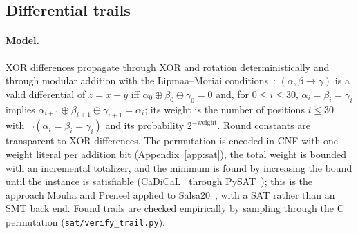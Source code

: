 \documentclass{iacrtrans}
\begin{document}
\subsection{Differential trails}
\label{sec:diff}
\paragraph{Model.} XOR differences propagate through XOR and rotation deterministically and through modular addition with the Lipmaa--Moriai conditions~\cite{LM01}: $(\alpha,\beta\to\gamma)$ is a valid differential of $z = x + y$ iff $\alpha_0\oplus\beta_0\oplus\gamma_0 = 0$ and, for $0 \le i \le 30$, $\alpha_i=\beta_i=\gamma_i$ implies $\alpha_{i+1}\oplus\beta_{i+1}\oplus\gamma_{i+1} = \alpha_i$; its weight is the number of positions $i \le 30$ with $\neg(\alpha_i=\beta_i=\gamma_i)$ and its probability $2^{-\text{weight}}$. Round constants are transparent to XOR differences. The permutation is encoded in CNF with one weight literal per addition bit (Appendix~\ref{app:sat}), the total weight is bounded with an incremental totalizer, and the minimum is found by increasing the bound until the instance is satisfiable (CaDiCaL~\cite{CaDiCaL} through PySAT~\cite{PySAT18}); this is the approach Mouha and Preneel applied to Salsa20~\cite{MP13}, with a SAT rather than an SMT back end. Found trails are checked empirically by sampling through the C permutation (\texttt{sat/verify\_trail.py}).
\end{document}
